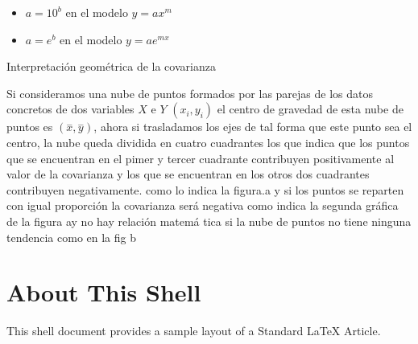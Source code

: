\documentclass{article}
\begin{document}
\begin{enumerate}
\begin{enumerate}
\begin{enumerate}
\begin{itemize}
\item $a=10^{b}$ en el modelo $y=ax^{m}$

\item $a=e^{b}$ en el modelo $y=ae^{mx}$
\end{itemize}

Interpretaci\'{o}n geom\'{e}trica de la covarianza

Si consideramos una nube de puntos formados por las parejas de los datos
concretos de dos variables $X$ e $Y$ $\left( x_{i},y_{i}\right) $ el centro
de gravedad de esta nube de puntos es $\left( \overset{-}{x},\overset{-}{y}%
\right) $, ahora si trasladamos los ejes de tal forma que este punto sea el
centro, la nube queda dividida en cuatro cuadrantes los que indica que los
puntos que se encuentran en el pimer y tercer cuadrante contribuyen
positivamente al valor de la covarianza y los que se encuentran en los otros
dos cuadrantes contribuyen negativamente. como lo indica la figura.a y si
los puntos se reparten con igual proporci\'{o}n la covarianza ser\'{a}
negativa como indica la segunda gr\'{a}fica de la figura ay no hay relaci\'{o}n matem\'{a}%
tica si la nube de puntos no tiene ninguna tendencia como en la fig b%
\end{enumerate}
\end{enumerate}
\end{enumerate}

\section{About This Shell}

This shell document provides a sample layout of a Standard LaTeX Article.
\end{document}
